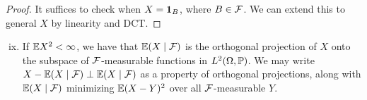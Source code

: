 \begin{proof}
    It suffices to check when $X = \mathbf 1_B$, where $B \in \mathcal F$. We can extend this to general $X$ by linearity and DCT.
\end{proof}
\begin{enumerate}[(i)] \setcounter{enumi}{8}
    \item If $\mathbb E X^2 < \infty$, we have that $\mathbb E(X \mid \mathcal F)$ is the orthogonal projection of $X$ onto the subspace of $\mathcal F$-measurable functions in $L^2(\Omega, \mathbb P)$. We may write $X - \mathbb E(X \mid \mathcal F) \perp \mathbb E(X \mid \mathcal F)$ as a property of orthogonal projections, along with $\mathbb E(X \mid \mathcal F)$ minimizing $\mathbb E(X - Y)^2$ over all $\mathcal F$-measurable $Y$.
\end{enumerate}
